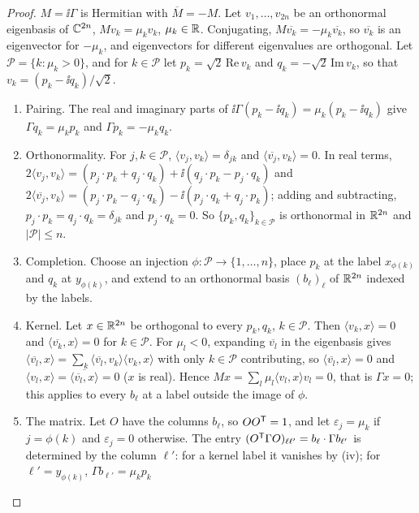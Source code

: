 \begin{proof}
$M=\ii\Gamma$ is Hermitian with $\overline M=-M$. Let $v_1,\ldots,v_{2n}$ be an orthonormal
eigenbasis of $\mathbb C^{2n}$, $Mv_k=\mu_kv_k$, $\mu_k\in\mathbb R$. Conjugating, $M\overline{v_k}=-\mu_k\overline{v_k}$,
so $\overline{v_k}$ is an eigenvector for $-\mu_k$, and eigenvectors for different eigenvalues
are orthogonal. Let $\mathcal P=\{k:\mu_k>0\}$, and for $k\in\mathcal P$ let $p_k=\sqrt2\,\mathrm{Re}\,v_k$ and
$q_k=-\sqrt2\,\mathrm{Im}\,v_k$, so that $v_k=(p_k-\ii q_k)/\sqrt2$.
\begin{enumerate}
\item[(i)] Pairing. The real and imaginary parts of $\ii\Gamma(p_k-\ii q_k)=\mu_k(p_k-\ii q_k)$
give $\Gamma q_k=\mu_kp_k$ and $\Gamma p_k=-\mu_kq_k$.
\item[(ii)] Orthonormality. For $j,k\in\mathcal P$, $\langle v_j,v_k\rangle=\delta_{jk}$ and
$\langle\overline{v_j},v_k\rangle=0$. In real terms,
$2\langle v_j,v_k\rangle=(p_j\cdot p_k+q_j\cdot q_k)+\ii(q_j\cdot p_k-p_j\cdot q_k)$ and
$2\langle\overline{v_j},v_k\rangle=(p_j\cdot p_k-q_j\cdot q_k)-\ii(p_j\cdot q_k+q_j\cdot p_k)$;
adding and subtracting, $p_j\cdot p_k=q_j\cdot q_k=\delta_{jk}$ and $p_j\cdot q_k=0$. So
$\{p_k,q_k\}_{k\in\mathcal P}$ is orthonormal in $\mathbb R^{2n}$ and $|\mathcal P|\leq n$.
\item[(iii)] Completion. Choose an injection $\phi:\mathcal P\to\{1,\ldots,n\}$, place $p_k$ at the
label $x_{\phi(k)}$ and $q_k$ at $y_{\phi(k)}$, and extend to an orthonormal basis
$(b_\ell)_\ell$ of $\mathbb R^{2n}$ indexed by the labels.
\item[(iv)] Kernel. Let $x\in\mathbb R^{2n}$ be orthogonal to every $p_k,q_k$, $k\in\mathcal P$. Then
$\langle v_k,x\rangle=0$ and $\langle\overline{v_k},x\rangle=0$ for $k\in\mathcal P$. For $\mu_l<0$,
expanding $\overline{v_l}$ in the eigenbasis gives
$\langle\overline{v_l},x\rangle=\sum_k\langle\overline{v_l},v_k\rangle\langle v_k,x\rangle$
with only $k\in\mathcal P$ contributing, so $\langle\overline{v_l},x\rangle=0$ and
$\langle v_l,x\rangle=\overline{\langle\overline{v_l},x\rangle}=0$ ($x$ is real). Hence
$Mx=\sum_l\mu_l\langle v_l,x\rangle v_l=0$, that is $\Gamma x=0$; this applies to every
$b_\ell$ at a label outside the image of $\phi$.
\item[(v)] The matrix. Let $O$ have the columns $b_\ell$, so $OO^{\mathsf T}=1$, and let
$\varepsilon_j=\mu_k$ if $j=\phi(k)$ and $\varepsilon_j=0$ otherwise. The entry
$(O^{\mathsf T}\Gamma O)_{\ell\ell'}=b_\ell\cdot\Gamma b_{\ell'}$ is determined by the column
$\ell'$: for a kernel label it vanishes by (iv); for $\ell'=y_{\phi(k)}$, $\Gamma b_{\ell'}=\mu_kp_k$

\end{enumerate}
\end{proof}
